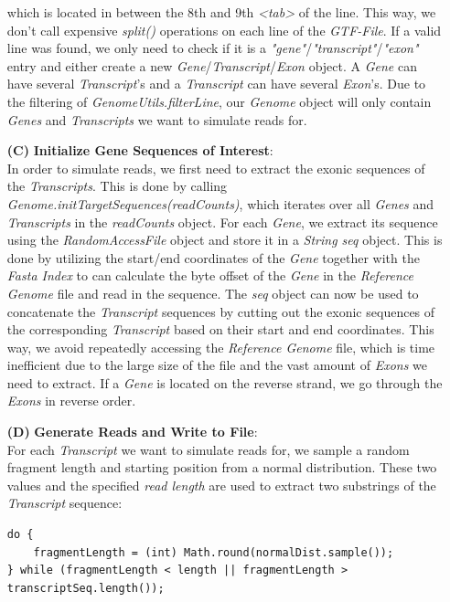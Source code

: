\documentclass[12pt]{article}
\begin{document}
\begin{enumerate}
		which is located in between the 8th and 9th \textit{<tab>} of the line. This way, we don't
		call expensive \textit{split()} operations on each line of the \textit{GTF-File}.
		If a valid line was found, we only need to check if it is a \textit{"gene"}/\textit{"transcript"}/\textit{"exon"} entry
		and either create a new \textit{Gene}/\textit{Transcript}/\textit{Exon} object. A \textit{Gene}
		can have several \textit{Transcript}'s and a \textit{Transcript} can have several \textit{Exon}'s.
		Due to the filtering of \textit{GenomeUtils.filterLine}, our \textit{Genome} object will only contain \textit{Genes} and
		\textit{Transcripts} we want to simulate reads for.
	\item[\textbf{(C)}] \textbf{Initialize Gene Sequences of Interest}:\\
		In order to simulate reads, we first need to extract the exonic sequences of the \textit{Transcripts}.
		This is done by calling \textit{Genome.initTargetSequences(readCounts)}, which iterates over all \textit{Genes} and
		\textit{Transcripts} in the \textit{readCounts} object. For each \textit{Gene}, we extract its sequence using
		the \textit{RandomAccessFile} object and store it in a \textit{String seq} object. This is done by
		utilizing the start/end coordinates of the \textit{Gene} together with the \textit{Fasta Index}
		to can calculate the byte offset of the \textit{Gene} in the \textit{Reference Genome}
		file and read in the sequence.
		The \textit{seq} object can now be used to concatenate the \textit{Transcript} sequences by
		cutting out the exonic sequences of the corresponding \textit{Transcript} based on their
		start and end coordinates.
		This way, we avoid repeatedly accessing the \textit{Reference Genome} file, which
		is time inefficient due to the large size of the file and the vast amount of \textit{Exons} we need to extract.
		If a \textit{Gene} is located on the reverse strand, we go through the \textit{Exons} in reverse order.
	\item[\textbf{(D)}] \textbf{Generate Reads and Write to File}:\\
		For each \textit{Transcript} we want to simulate reads for, we sample a random fragment length and starting position from a normal distribution.
		These two values and the specified \textit{read length} are used to extract two substrings of the \textit{Transcript} sequence:
		\begin{verbatim}
do {
    fragmentLength = (int) Math.round(normalDist.sample());
} while (fragmentLength < length || fragmentLength > transcriptSeq.length());

\end{verbatim}
\end{enumerate}
\end{document}
